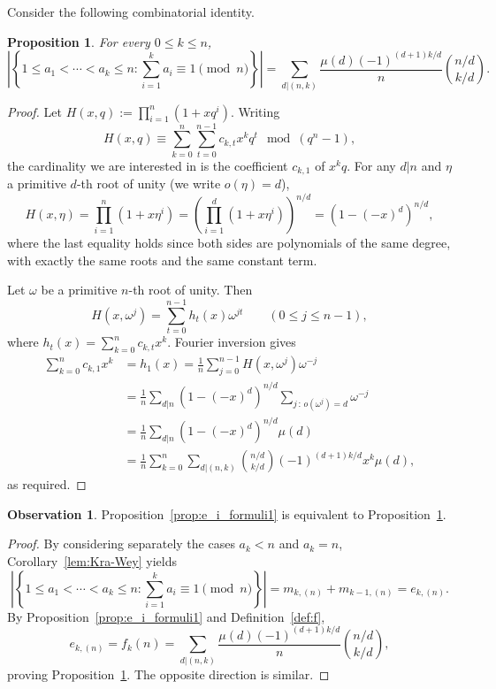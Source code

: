 \documentclass[10pt]{article}
\newtheorem{proposition}[theorem]{Proposition}
\theoremstyle{definition}
\newtheorem{observation}[cdrthm]{Observation}
\begin{document}
Consider the following combinatorial identity.

\begin{proposition}\label{t:equivalence_KW}
    For every $0 \le k \le n$,
    \[
        \left| \left\{ 1 \le a_1 < \cdots < a_k \le n : \sum_{i=1}^k a_i\equiv 1 \!\!\!\!\pmod{n} \right\} \right| 
        = \sum_{d|(n,k)} \frac{\mu(d)(-1)^{(d+1)k/d}}{n} \binom{n/d}{k/d}.
    \]
\end{proposition}
	
\begin{proof}
    Let 
    $H(x,q):=\prod_{i=1}^n(1+xq^i)$. 
    Writing
    \[
        H(x,q) \equiv \sum_{k=0}^{n} \sum_{t=0}^{n-1} c_{k,t} x^kq^t \mod (q^n-1),
    \] 
    the cardinality we are interested in is the coefficient $c_{k,1}$ of $x^kq$.
    For any $d|n$ and $\eta$ a primitive $d$-th root of unity (we write $o(\eta)= d$), 
    \[
        H(x,\eta) 
        = \prod_{i=1}^n (1+x\eta^i) 
        = \left( \prod_{i=1}^d (1+x\eta^i) \right)^{n/d} 
        = (1-(-x)^d)^{n/d},
    \]
    where the last equality holds since both sides are polynomials of the same degree, with exactly the same roots and the same constant term. 
    
    Let $\omega$ be a primitive $n$-th root of unity. Then
    \[
        H(x,\omega^j) = \sum_{t=0}^{n-1} h_t(x)\omega^{jt}
        \qquad (0 \le j \le n-1),
    \]
    where $h_t(x) = \sum_{k=0}^n c_{k,t} x^k$. 
    Fourier inversion gives
    \begin{align*}
        \sum_{k=0}^{n} c_{k,1}x^k 
        &= h_1(x)
        = \frac{1}{n} \sum_{j=0}^{n-1} H(x,\omega^j) \omega^{-j} \\
        &= \frac{1}{n} \sum_{d|n}  (1-(-x)^d)^{n/d}
        \sum_{j \,:\, o(\omega^j)=d} \omega^{-j} \\
        &= \frac{1}{n} \sum_{d|n}  (1-(-x)^d)^{n/d}
        \mu(d) \\
        &= \frac{1}{n} \sum_{k=0}^{n} \sum_{d|(n,k)} \binom{n/d}{k/d} (-1)^{(d+1)k/d} x^k \mu(d),
    \end{align*}
    as required.
\end{proof}

\begin{observation}\label{prop:equiv_f_KW}
    Proposition~\ref{prop:e_i_formuli1} is equivalent to Proposition~\ref{t:equivalence_KW}.
\end{observation}

\begin{proof}
    By considering separately the cases $a_k < n$ and $a_k = n$, Corollary~\ref{lem:Kra-Wey} yields 
    \[
        \left| \left\{ 1 \le a_1 < \cdots < a_k \le n : \sum_{i=1}^k a_i \equiv 1 \!\!\!\!\pmod{n} \right\} \right|
        = m_{k,(n)} + m_{k-1,(n)} 
        = e_{k,(n)}.
    \]
    By Proposition~\ref{prop:e_i_formuli1} and Definition~\ref{def:f},
    \[
        e_{k,(n)} 
        = f_k(n)
        = \sum_{d|(n,k)} \frac{\mu(d)(-1)^{(d+1)k/d}}{n} \binom{n/d}{k/d},
    \]
    proving Proposition~\ref{t:equivalence_KW}.
    The opposite direction is similar. 
\end{proof}
    
\end{document}
